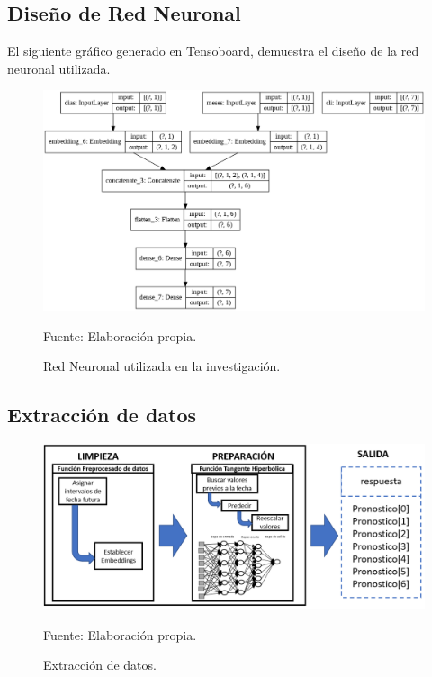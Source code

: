 \newpage

\subsection{Diseño de Red Neuronal}

El siguiente gráfico generado en Tensoboard, demuestra el diseño de la red neuronal utilizada.

\begin{figure}[H]
	\centering
		\includegraphics[scale=0.42]{imagenes/neuralnetwork.png}
		\caption{Red Neuronal utilizada en la investigación.}
	\begin{center}
    Fuente: Elaboración propia.
    \end{center}
	\label{fig:39}
\end{figure}

\newpage
\subsection{Extracción de datos}
\begin{figure}[h!]
	\centering
		\includegraphics[scale=0.4]{imagenes/extracciondatos.png}
		\caption{Extracción de datos.}
	\begin{center}
    Fuente: Elaboración propia.
    \end{center}
	\label{fig:extracciondedatos}
\end{figure}

